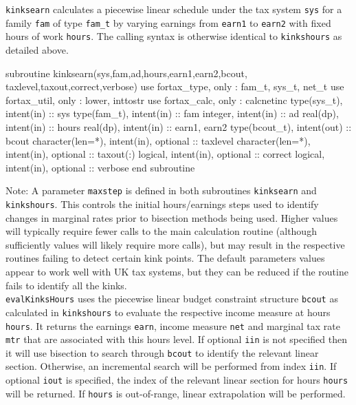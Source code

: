 \documentclass[11pt,thmsa,letter,ukenglish]{article}
\begin{document}
\noindent\texttt{kinksearn} calculates a piecewise linear schedule under the tax system \texttt{sys} for a family \texttt{fam} of type \texttt{fam\_t} by varying earnings from \texttt{earn1} to \texttt{earn2} with fixed hours of work \texttt{hours}. The calling syntax is otherwise identical to \texttt{kinkshours} as detailed above.
\begin{fortrancode}
subroutine kinksearn(sys,fam,ad,hours,earn1,earn2,bcout, taxlevel,taxout,correct,verbose)
    use fortax_type,  only : fam_t, sys_t, net_t
    use fortax_util,  only : lower, inttostr
    use fortax_calc,  only : calcnetinc
    type(sys_t),      intent(in)  :: sys
    type(fam_t),      intent(in)  :: fam
    integer,          intent(in)  :: ad
    real(dp),         intent(in)  :: hours
    real(dp),         intent(in)  :: earn1, earn2
    type(bcout_t),    intent(out) :: bcout
    character(len=*), intent(in), optional :: taxlevel
    character(len=*), intent(in), optional :: taxout(:)
    logical,          intent(in), optional :: correct
    logical,          intent(in), optional :: verbose
end subroutine
\end{fortrancode}

Note: A parameter \texttt{maxstep} is defined in both subroutines \texttt{kinksearn} and \texttt{kinkshours}. This controls the initial hours/earnings steps used to identify changes in marginal rates prior to bisection methods being used. Higher values will typically require fewer calls to the main calculation routine (although sufficiently values will likely require more calls), but may result in the respective routines failing to detect certain kink points. The default parameters values appear to work well with UK tax systems, but they can be reduced if the routine fails to identify all the kinks.\\

\noindent\texttt{evalKinksHours} uses the piecewise linear budget constraint structure \texttt{bcout} as calculated in \texttt{kinkshours} to evaluate the respective income measure at hours \texttt{hours}. It returns the earnings \texttt{earn}, income measure \texttt{net} and marginal tax rate \texttt{mtr} that are associated with this hours level. If optional \texttt{iin} is not specified then it will use bisection to search through \texttt{bcout} to identify the relevant linear section. Otherwise, an incremental search will be performed from index \texttt{iin}. If optional \texttt{iout} is specified, the index of the relevant linear section for hours \texttt{hours} will be returned. If \texttt{hours} is out-of-range, linear extrapolation will be performed.
\end{document}
